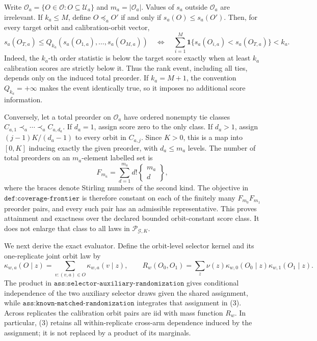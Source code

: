 Write \(\mathcal O_a=\{O\in\mathcal O:O\subseteq\mathcal U_a\}\) and \(m_a=|\mathcal O_a|\). Values of \(s_a\) outside \(\mathcal O_a\) are irrelevant. If \(k_a\le M\), define \(O\preceq_a O'\) if and only if \(s_a(O)\le s_a(O')\). Then, for every target orbit and calibration-orbit vector,
\[
s_a(O_{T,a})\le Q_{k_a}(s_a(O_{1,a}),\ldots,s_a(O_{M,a}))
\quad\Longleftrightarrow\quad
\sum_{i=1}^M\mathbf 1\{s_a(O_{i,a})<s_a(O_{T,a})\}<k_a.
\tag{1}
\]
Indeed, the \(k_a\)-th order statistic is below the target score exactly when at least \(k_a\) calibration scores are strictly below it. Thus the rank event, including all ties, depends only on the induced total preorder. If \(k_a=M+1\), the convention \(Q_{k_a}=+\infty\) makes the event identically true, so it imposes no additional score information.

Conversely, let a total preorder on \(\mathcal O_a\) have ordered nonempty tie classes \(C_{a,1}\prec_a\cdots\prec_a C_{a,d_a}\). If \(d_a=1\), assign score zero to the only class. If \(d_a>1\), assign \((j-1)K/(d_a-1)\) to every orbit in \(C_{a,j}\). Since \(K>0\), this is a map into \([0,K]\) inducing exactly the given preorder, with \(d_a\le m_a\) levels. The number of total preorders on an \(m_a\)-element labelled set is
\[
F_{m_a}=\sum_{d=1}^{m_a}d!\left\{\begin{matrix}m_a\\ d\end{matrix}\right\},
\tag{2}
\]
where the braces denote Stirling numbers of the second kind. The objective in \(\texttt{def:coverage-frontier}\) is therefore constant on each of the finitely many \(F_{m_0}F_{m_1}\) preorder pairs, and every such pair has an admissible representative. This proves attainment and exactness over the declared bounded orbit-constant score class. It does not enlarge that class to all laws in \(\mathcal P_{\mathcal G,K}\).

We next derive the exact evaluator. Define the orbit-level selector kernel and its one-replicate joint orbit law by
\[
\kappa_{w,a}(O\mid z)=\sum_{v:(v,a)\in O}\kappa_{w,a}(v\mid z),
\qquad
R_w(O_0,O_1)=\sum_z\nu(z)\kappa_{w,0}(O_0\mid z)\kappa_{w,1}(O_1\mid z).
\tag{3}
\]
The product in \(\texttt{ass:selector-auxiliary-randomization}\) gives conditional independence of the two auxiliary selector draws given the shared assignment, while \(\texttt{ass:known-matched-randomization}\) integrates that assignment in (3). Across replicates the calibration orbit pairs are iid with mass function \(R_w\). In particular, (3) retains all within-replicate cross-arm dependence induced by the assignment; it is not replaced by a product of its marginals.

